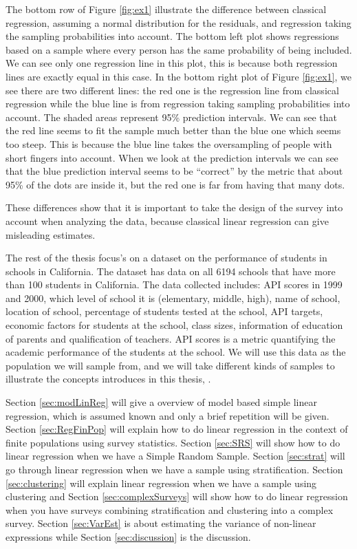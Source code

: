 \documentclass{article}
\begin{document}
\begin{example}
The bottom row of Figure \ref{fig:ex1} illustrate the difference between
classical regression, assuming a normal distribution for the residuals,
and regression taking the sampling probabilities into account. The bottom left plot shows regressions based on a
sample where every person has the same probability of being included. We can see
only one regression line in this plot, this is because both regression lines are
exactly equal in this case. In the bottom right plot of Figure \ref{fig:ex1}, we
see there are two different lines: the red one is the regression line from
classical regression while the blue line is from regression taking sampling
probabilities into account. The shaded areas represent 95\%
prediction intervals. We can see that the red line seems to fit the sample much
better than the blue one which seems too steep. This is because the
blue line takes the oversampling of people with short fingers into account. When we look at the prediction
intervals we can see that the blue prediction interval seems to be ``correct''
by the metric that about 95\% of the dots are inside it, but the red one is far
from having that many dots.

These differences show that it is important to take the design of the survey
into account when analyzing the data, because classical linear regression can
give misleading estimates.
\end{example}

The rest of the thesis focus's on a dataset on the performance of students in schools in
California. The dataset has data on all 6194 schools that have more than 100
students in California. The data collected
includes: API scores in 1999 and 2000, which level of school it is
(elementary, middle, high), name of school, location of school, percentage of
students tested at the school, API targets, economic factors for students at the
school, class sizes, information of education of parents and qualification of teachers.
API scores is a metric quantifying the academic performance of the students at the school.
We will use this data as the population we will sample from, and we will take
different kinds of samples to illustrate the concepts introduces in this thesis,
\cite[Section 1.2]{complexR}.

Section \ref{sec:modLinReg} will give a overview of model based simple
linear regression, which is assumed known and only a brief repetition will be given.
Section \ref{sec:RegFinPop} will explain how to do linear regression in the context of finite
populations using survey statistics. Section \ref{sec:SRS} will show how to do linear
regression when we have a Simple Random Sample. Section \ref{sec:strat} will go through
linear regression when we have a sample using stratification. Section \ref{sec:clustering} will
explain linear regression when we have a sample using clustering and Section \ref{sec:complexSurveys}
will show how to do linear regression when you have surveys combining
stratification and clustering into a complex survey. Section \ref{sec:VarEst} is
about estimating the variance of non-linear expressions while Section
\ref{sec:discussion} is the discussion.
\end{document}
